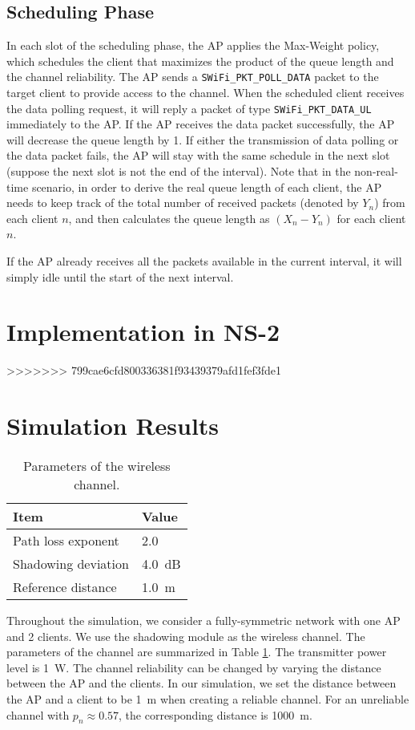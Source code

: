 \documentclass{article}
\begin{document}
\subsection{Scheduling Phase}
In each slot of the scheduling phase, the AP applies the Max-Weight policy, which schedules the client that maximizes the product of the queue length and the channel reliability. The AP sends a \lstinline|SWiFi_PKT_POLL_DATA| packet to the target client to provide access to the channel. When the scheduled client receives the data polling request, it will reply a packet of type \lstinline|SWiFi_PKT_DATA_UL| immediately to the AP. If the AP receives the data packet successfully, the AP will decrease the queue length by 1. If either the transmission of data polling or the data packet fails, the AP will stay with the same schedule in the next slot (suppose the next slot is not the end of the interval). Note that in the non-real-time scenario, in order to derive the real queue length of each client, the AP needs to keep track of the total number of received packets (denoted by $Y_n$) from each client $n$, and then calculates the queue length as $(X_n - Y_n)$ for each client $n$.

If the AP already receives all the packets available in the current interval, it will simply idle until the start of the next interval.

     

\section{Implementation in NS-2}
\label{section: ns2}
>>>>>>> 799cae6cfd800336381f93439379afd1fef3fde1


\section{Simulation Results}
\begin{table}[htbp]
\centering
    \caption{Parameters of the wireless channel.}
    \vspace{2mm}
    \begin{tabular}{ | l | l | }
    \hline
    Item & Value \\ \hline
    Path loss exponent & 2.0  \\ \hline
    Shadowing deviation & \SI{4.0}{dB} \\ \hline
    Reference distance & \SI{1.0}{m} \\
    \hline
\end{tabular}
\label{table: channel}
\end{table}
Throughout the simulation, we consider a fully-symmetric network with one AP and 2 clients. We use the shadowing module as the wireless channel. The parameters of the channel are summarized in Table \ref{table: channel}. The transmitter power level is \SI{1}{W}. The channel reliability can be changed by varying the distance between the AP and the clients. In our simulation, we set the distance between the AP and a client to be \SI{1}{m} when creating a reliable channel. For an unreliable channel with $p_n\approx 0.57$, the corresponding distance is \SI{1000}{m}. 
\end{document}
